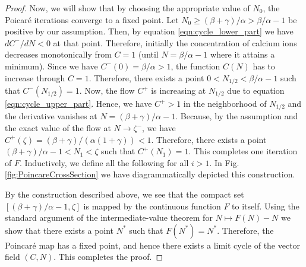 \documentclass[12pt,a4paper]{article}
\begin{document}
\begin{proof}
Now, we will show that by choosing the appropriate value of $N_0$, the Poicar\'e iterations converge to a fixed point. Let $N_0 \geq (\beta+\gamma)/\alpha > \beta/\alpha-1$ be positive by our assumption. Then, by equation \eqref{eqn:cycle_lower_part} we have $dC^-/dN < 0$ at that point. Therefore, initially the concentration of calcium ions decreases monotonically from $C=1$ (until $N = \beta/\alpha -1$ where it attains a minimum). Since we have $C^-(0) = \beta/\alpha > 1$, the function $C(N)$ has to increase through $C=1$. Therefore, there exists a point $0<N_{1/2} < \beta/\alpha-1$ such that $C^-(N_{1/2}) = 1$. Now, the flow $C^+$ is increasing at $N_{1/2}$ due to equation \eqref{eqn:cycle_upper_part}. Hence, we have $C^+ > 1$ in the neighborhood of $N_{1/2}$ and the derivative vanishes at $N = (\beta+\gamma)/\alpha-1$. Because, by the assumption and the exact value of the flow at $N\rightarrow \zeta^{-}$, we have $C^+(\zeta) = (\beta+\gamma)/(\alpha(1+\gamma)) < 1$. Therefore, there exists a point $(\beta+\gamma)/\alpha-1 < N_1 < \zeta$ such that $C^+(N_1) = 1$. This completes one iteration of $F$. Inductively, we define all the following for all $i > 1$. In Fig. \ref{fig:PoincareCrossSection} we have diagrammatically depicted this construction. 

By the construction described above, we see that the compact set $[(\beta+\gamma)/\alpha-1, \zeta]$ is mapped by the continuous function $F$ to itself. Using the standard argument of the intermediate-value theorem for $N \mapsto F(N) - N$ we show that there exists a point $N^*$ such that $F(N^*) = N^*$. Therefore, the Poincar\'e map has a fixed point, and hence there exists a limit cycle of the vector field $(C,N)$. This completes the proof. 
\end{proof}
\end{document}

